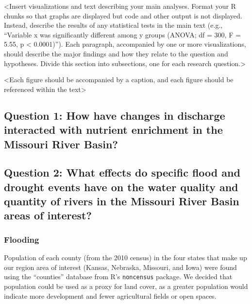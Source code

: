 \documentclass[12pt,]{article}
\begin{document}
\textless{}Insert visualizations and text describing your main analyses.
Format your R chunks so that graphs are displayed but code and other
output is not displayed. Instead, describe the results of any
statistical tests in the main text (e.g., ``Variable x was significantly
different among y groups (ANOVA; df = 300, F = 5.55, p \textless{}
0.0001)''). Each paragraph, accompanied by one or more visualizations,
should describe the major findings and how they relate to the question
and hypotheses. Divide this section into subsections, one for each
research question.\textgreater{}

\textless{}Each figure should be accompanied by a caption, and each
figure should be referenced within the text\textgreater{}

\hypertarget{question-1-how-have-changes-in-discharge-interacted-with-nutrient-enrichment-in-the-missouri-river-basin}{%
\subsection{Question 1: How have changes in discharge interacted with
nutrient enrichment in the Missouri River
Basin?}\label{question-1-how-have-changes-in-discharge-interacted-with-nutrient-enrichment-in-the-missouri-river-basin}}

\hypertarget{question-2-what-effects-do-specific-flood-and-drought-events-have-on-the-water-quality-and-quantity-of-rivers-in-the-missouri-river-basin-areas-of-interest}{%
\subsection{Question 2: What effects do specific flood and drought
events have on the water quality and quantity of rivers in the Missouri
River Basin areas of
interest?}\label{question-2-what-effects-do-specific-flood-and-drought-events-have-on-the-water-quality-and-quantity-of-rivers-in-the-missouri-river-basin-areas-of-interest}}

\hypertarget{flooding}{%
\subsubsection{Flooding}\label{flooding}}

Population of each county (from the 2010 census) in the four states that
make up our region area of interest (Kansas, Nebraska, Missouri, and
Iowa) were found using the ``counties'' database from R's
\texttt{noncensus} package. We decided that population could be used as
a proxy for land cover, as a greater population would indicate more
development and fewer agricultural fields or open spaces.
\end{document}
